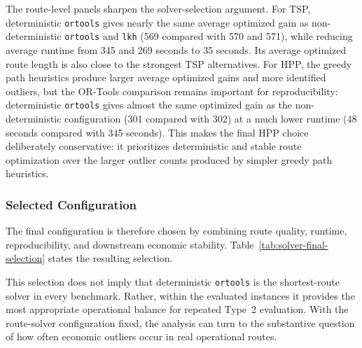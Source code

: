 \documentclass[preprint,12pt]{elsarticle}
\begin{document}
The route-level panels sharpen the solver-selection argument. For TSP, deterministic \texttt{ortools} gives nearly the same average optimized gain as non-deterministic \texttt{ortools} and \texttt{lkh} (569 compared with 570 and 571), while reducing average runtime from 345 and 269 seconds to 35 seconds. Its average optimized route length is also close to the strongest TSP alternatives. For HPP, the greedy path heuristics produce larger average optimized gains and more identified outliers, but the OR-Tools comparison remains important for reproducibility: deterministic \texttt{ortools} gives almost the same optimized gain as the non-deterministic configuration (301 compared with 302) at a much lower runtime (48 seconds compared with 345 seconds). This makes the final HPP choice deliberately conservative: it prioritizes deterministic and stable route optimization over the larger outlier counts produced by simpler greedy path heuristics.

\subsubsection{Selected Configuration}

The final configuration is therefore chosen by combining route quality, runtime, reproducibility, and downstream economic stability. Table~\ref{tab:solver-final-selection} states the resulting selection.

\begin{table}[htbp]
\centering
\caption{Final route-solver configuration used in the subsequent empirical analysis.}
\label{tab:solver-final-selection}
\end{table}

This selection does not imply that deterministic \texttt{ortools} is the shortest-route solver in every benchmark. Rather, within the evaluated instances it provides the most appropriate operational balance for repeated Type~2 evaluation. With the route-solver configuration fixed, the analysis can turn to the substantive question of how often economic outliers occur in real operational routes.
\end{document}
